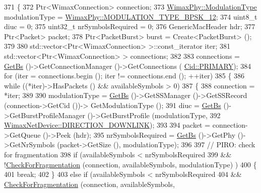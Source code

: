 \begin{DoxyCode}
371 \{
372   Ptr<WimaxConnection> connection;
373   \hyperlink{classns3_1_1WimaxPhy_a044c5d8a48ca992c39c2a946f6e755fa}{WimaxPhy::ModulationType} modulationType = 
      \hyperlink{classns3_1_1WimaxPhy_a044c5d8a48ca992c39c2a946f6e755faaef0b78541d9b66d4e85780131e665028}{WimaxPhy::MODULATION\_TYPE\_BPSK\_12};
374   uint8\_t diuc = 0;
375   uint32\_t nrSymbolsRequired = 0;
376   GenericMacHeader hdr;
377   Ptr<Packet> packet;
378   Ptr<PacketBurst> burst = Create<PacketBurst> ();
379 
380   std::vector<Ptr<WimaxConnection> >::const\_iterator iter;
381   std::vector<Ptr<WimaxConnection> > connections;
382 
383   connections = \hyperlink{classns3_1_1BSScheduler_a8b09065ac8f74cb35446af55128e41c7}{GetBs} ()->GetConnectionManager ()->GetConnections (
      \hyperlink{classns3_1_1Cid_a10b8f92080ca5790e65a0bfa2f557e0aa0ffb28b79686aa37c614c868e330418b}{Cid::PRIMARY});
384   \textcolor{keywordflow}{for} (iter = connections.begin (); iter != connections.end (); ++iter)
385     \{
386       \textcolor{keywordflow}{while} ((*iter)->HasPackets () && availableSymbols > 0)
387         \{
388           connection = *iter;
389 
390           modulationType = \hyperlink{classns3_1_1BSScheduler_a8b09065ac8f74cb35446af55128e41c7}{GetBs} ()->GetSSManager ()->GetSSRecord (connection->GetCid ())->
      GetModulationType ();
391           diuc = \hyperlink{classns3_1_1BSScheduler_a8b09065ac8f74cb35446af55128e41c7}{GetBs} ()->GetBurstProfileManager ()->GetBurstProfile (modulationType,
392                                                                        
      \hyperlink{classns3_1_1WimaxNetDevice_a194b6cf7eb59582328eb2531dc9ed884a5873dae7c36e21d904ae2d6922835e89}{WimaxNetDevice::DIRECTION\_DOWNLINK});
393 
394           packet = connection->GetQueue ()->Peek (hdr);
395           nrSymbolsRequired = \hyperlink{classns3_1_1BSScheduler_a8b09065ac8f74cb35446af55128e41c7}{GetBs} ()->GetPhy ()->GetNrSymbols (packet->GetSize (), modulationType);
396 
397           \textcolor{comment}{// PIRO: check for fragmentation}
398           \textcolor{keywordflow}{if} (availableSymbols < nrSymbolsRequired
399               && !\hyperlink{classns3_1_1BSScheduler_aedd94450afdda0371fae56e05624bfaf}{CheckForFragmentation} (connection, availableSymbols, modulationType)
      )
400             \{
401               \textcolor{keywordflow}{break};
402             \}
403           \textcolor{keywordflow}{else} \textcolor{keywordflow}{if} (availableSymbols < nrSymbolsRequired
404                    && \hyperlink{classns3_1_1BSScheduler_aedd94450afdda0371fae56e05624bfaf}{CheckForFragmentation} (connection, availableSymbols, 

\end{DoxyCode}
